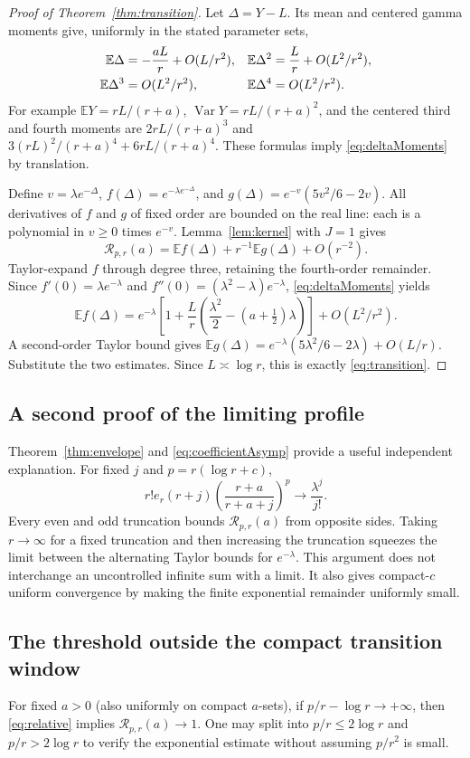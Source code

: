 \documentclass[11pt]{article}
\numberwithin{equation}{section}
\theoremstyle{definition}\newtheorem{definition}[theorem]{Definition}
\theoremstyle{remark}\newtheorem{remark}[theorem]{Remark}
\newcommand{\E}{\mathbb E}\newcommand{\ii}{\mathrm i}
\begin{document}
\begin{proof}[Proof of Theorem~\ref{thm:transition}]
Let $\Delta=Y-L$. Its mean and centered gamma moments give, uniformly in the stated parameter sets,
\begin{align}\label{eq:deltaMoments}
 \E\Delta&=-\frac{aL}{r}+O(L/r^2),&
 \E\Delta^2&=\frac Lr+O(L^2/r^2),\\
 \E\Delta^3&=O(L^2/r^2),&
 \E\Delta^4&=O(L^2/r^2).\notag
\end{align}
For example $\E Y=rL/(r+a)$, $\operatorname{Var}Y=rL/(r+a)^2$, and the centered third and fourth moments are $2rL/(r+a)^3$ and $3(rL)^2/(r+a)^4+6rL/(r+a)^4$. These formulas imply \eqref{eq:deltaMoments} by translation.

Define $v=\lambda e^{-\Delta}$,
$f(\Delta)=e^{-\lambda e^{-\Delta}}$, and
$g(\Delta)=e^{-v}(5v^2/6-2v)$. All derivatives of $f$ and $g$ of fixed order are bounded on the real line: each is a polynomial in $v\ge0$ times $e^{-v}$. Lemma~\ref{lem:kernel} with $J=1$ gives
\[
 \mathcal R_{p,r}(a)=\E f(\Delta)+r^{-1}\E g(\Delta)+O(r^{-2}).
\]
Taylor-expand $f$ through degree three, retaining the fourth-order remainder. Since
$f'(0)=\lambda e^{-\lambda}$ and
$f''(0)=(\lambda^2-\lambda)e^{-\lambda}$, \eqref{eq:deltaMoments} yields
\[
 \E f(\Delta)=e^{-\lambda}
 \left[1+\frac Lr\left(\frac{\lambda^2}{2}-(a+\tfrac12)\lambda\right)\right]
 +O(L^2/r^2).
\]
A second-order Taylor bound gives
$\E g(\Delta)=e^{-\lambda}(5\lambda^2/6-2\lambda)+O(L/r)$.
Substitute the two estimates. Since $L\asymp\log r$, this is exactly \eqref{eq:transition}.
\end{proof}

\subsection{A second proof of the limiting profile}
Theorem~\ref{thm:envelope} and \eqref{eq:coefficientAsymp} provide a useful independent explanation. For fixed $j$ and $p=r(\log r+c)$,
\[
 r!e_r(r+j)\left(\frac{r+a}{r+a+j}\right)^p
 \longrightarrow\frac{\lambda^j}{j!}.
\]
Every even and odd truncation bounds $\mathcal R_{p,r}(a)$ from opposite sides. Taking $r\to\infty$ for a fixed truncation and then increasing the truncation squeezes the limit between the alternating Taylor bounds for $e^{-\lambda}$. This argument does not interchange an uncontrolled infinite sum with a limit. It also gives compact-$c$ uniform convergence by making the finite exponential remainder uniformly small.

\subsection{The threshold outside the compact transition window}
For fixed $a>0$ (also uniformly on compact $a$-sets), if
$p/r-\log r\to+\infty$, then \eqref{eq:relative} implies
$\mathcal R_{p,r}(a)\to1$. One may split into $p/r\le2\log r$ and $p/r>2\log r$ to verify the exponential estimate without assuming $p/r^2$ is small.
\end{document}
